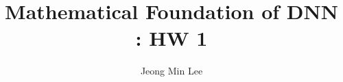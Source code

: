\documentclass[10pt]{article}
\title{\textbf{Mathematical Foundation of DNN : HW 1}}
\author{Jeong Min Lee}
\begin{document}
\maketitle

\section{}
\end{document}
